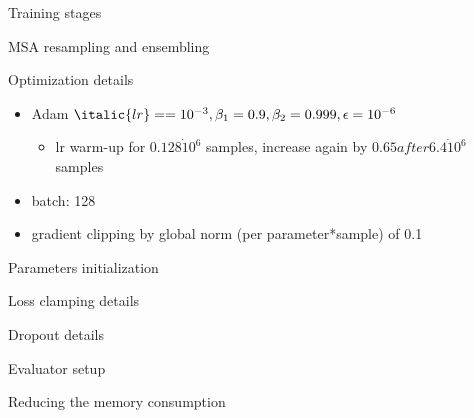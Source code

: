 \documentclass[presentation, smaller]{beamer}
\begin{document}
\begin{frame}[label={sec:org4f28bc1}]{Training stages  \cite{jumperHighlyAccurateProtein2021}}
\end{frame}
\begin{frame}[label={sec:org3d85acc}]{MSA resampling and ensembling  \cite{jumperHighlyAccurateProtein2021}}
\end{frame}
\begin{frame}[label={sec:org7e91a0c}]{Optimization details  \cite{jumperHighlyAccurateProtein2021}}
\begin{itemize}
\item Adam \(\italic{lr} == 10^{-3}, \beta_1 = 0.9, \beta_2 = 0.999, \epsilon = 10^{-6}\)
\begin{itemize}
\item lr warm-up for \(0.128 \dot 10^6\) samples, increase again by \(0.65 after 6.4 \dot 10^6\) samples
\end{itemize}
\item batch: 128
\item gradient clipping by global norm (per parameter*sample) of 0.1
\end{itemize}
\end{frame}

\begin{frame}[label={sec:org186622e}]{Parameters initialization  \cite{jumperHighlyAccurateProtein2021}}
\end{frame}
\begin{frame}[label={sec:org423292d}]{Loss clamping details  \cite{jumperHighlyAccurateProtein2021}}
\end{frame}
\begin{frame}[label={sec:orgba1dbc6}]{Dropout details  \cite{jumperHighlyAccurateProtein2021}}
\end{frame}
\begin{frame}[label={sec:org09eaaef}]{Evaluator setup  \cite{jumperHighlyAccurateProtein2021}}
\end{frame}
\begin{frame}[label={sec:orgbac25a3}]{Reducing the memory consumption  \cite{jumperHighlyAccurateProtein2021}}
\end{frame}
\end{document}

